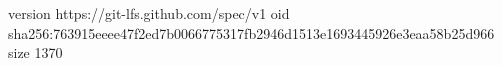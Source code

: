 version https://git-lfs.github.com/spec/v1
oid sha256:763915eeee47f2ed7b0066775317fb2946d1513e1693445926e3eaa58b25d966
size 1370
